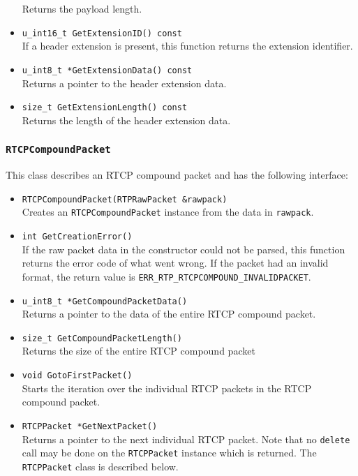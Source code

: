 \documentclass[12pt,a4paper]{article}
\newcommand{\headerfile}[1]{\marginpar{\scriptsize Header:\\{\tt #1}}}
\begin{document}
\begin{itemize}
						Returns the payload length.
					\item {\tt u\_int16\_t GetExtensionID() const}\\
						If a header extension is present, this function
						returns the extension identifier.
					\item {\tt u\_int8\_t *GetExtensionData() const}\\
						Returns a pointer to the header extension data.
					\item {\tt size\_t GetExtensionLength() const}\\
						Returns the length of the header extension data.
				\end{itemize}

			\subsubsection{\tt RTCPCompoundPacket}\headerfile{rtpcompoundpacket.h}

				This class describes an RTCP compound packet and has the following
				interface:
				\begin{itemize}
					\item {\tt RTCPCompoundPacket(RTPRawPacket \&rawpack)}\\
						Creates an {\tt RTCPCompoundPacket} instance from the
						data in {\tt rawpack}.
					\item {\tt int GetCreationError()}\\
						If the raw packet data in the constructor could not
						be parsed, this function returns the error code of
						what went wrong. If the packet had an invalid format,
						the return value is {\tt ERR\_\-RTP\_\-RTCPCOMPOUND\_\-INVALID\-PACKET}.
					\item {\tt u\_int8\_t *GetCompoundPacketData()}\\
						Returns a pointer to the data of the entire RTCP compound packet.
					\item {\tt size\_t GetCompoundPacketLength()}\\
						Returns the size of the entire RTCP compound packet
					\item {\tt void GotoFirstPacket()}\\
						Starts the iteration over the individual RTCP packets in
						the RTCP compound packet.
					\item {\tt RTCPPacket *GetNextPacket()}\\
						Returns a pointer to the next individual RTCP packet. Note
						that no {\tt delete} call may be done on the {\tt RTCPPacket}
						instance which is returned. The {\tt RTCPPacket} class is
						described below.
				\end{itemize}
				
\end{document}
